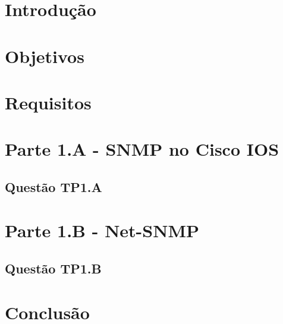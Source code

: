 \documentclass[12pt,a4paper,table]{report}
\begin{document}
 



{
\tableofcontents
{}
}

{
\let\origaddvspace\addvspace
 \renewcommand{\addvspace}[1]{}
 \listoffigures
 \listoftables
 \lstlistoflistings
 \renewcommand{\addvspace}[1]{\origaddvspace{#1}}
 }
 
\chapter{Introdução}


\chapter{Objetivos}


\chapter{Requisitos}


\chapter{Parte 1.A - SNMP no Cisco IOS}


\section{Questão TP1.A}


\chapter{Parte 1.B - Net-SNMP}


\section{Questão TP1.B}


\chapter{Conclusão}


\restoregeometry
\end{document}
